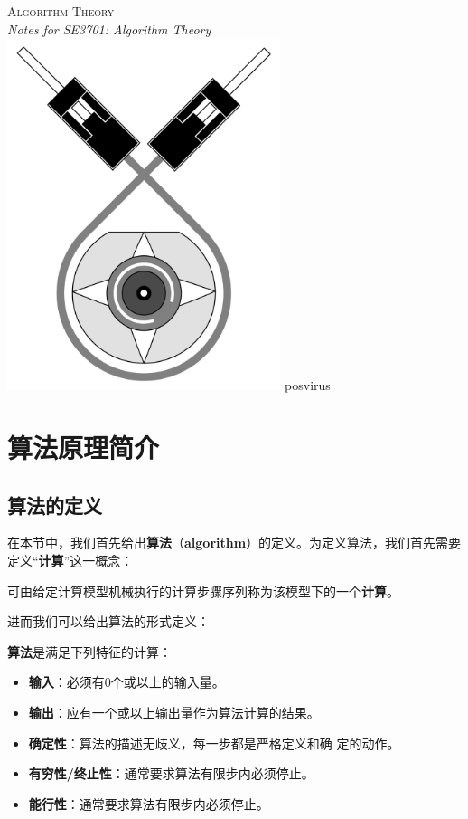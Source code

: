 \documentclass[12pt,a4paper,violet]{bbe}
\newcommand{\HUGE}{\fontsize{50}{60}}
\newcommand{\thesubtitle}{Notes for SE3701: Algorithm Theory}
\newcommand{\theauthor}{posvirus}
\begin{document}
	{\bfseries
	\thispagestyle{empty}
	\begin{center}
		{\HUGE\textsc{Algorithm Theory}} \\
		\vspace{0.5cm}
		{\Large\emph{\thesubtitle}} \\
		\vspace{1cm}
		\includegraphics[width=0.6\textwidth]{cover.png}
		\pagecolor{cover}
		\vfill
		\theauthor
	\end{center}
}
{
\newpage
\thispagestyle{empty}
}
{

\tableofcontents
}
\setcounter{page}{0}
	\chapter{算法原理简介}
	\section{算法的定义}
	在本节中，我们首先给出\textbf{算法}（\textbf{algorithm}）的定义。为定义算法，我们首先需要定义“\textbf{计算}”这一概念：
	\begin{definition}
可由给定计算模型机械执行的计算步骤序列称为该模型下的一个\textbf{计算}。
	\end{definition}
进而我们可以给出算法的形式定义：
	\begin{definition}
	\textbf{算法}是满足下列特征的计算：
	\begin{itemize}
		\item \textbf{输入}：必须有0个或以上的输入量。
		\item \textbf{输出}：应有一个或以上输出量作为算法计算的结果。
		\item \textbf{确定性}：算法的描述无歧义，每一步都是严格定义和确
		定的动作。
		\item \textbf{有穷性/终止性}：通常要求算法有限步内必须停止。
		\item \textbf{能行性}：通常要求算法有限步内必须停止。
	\end{itemize}
\end{definition}
\end{document}
